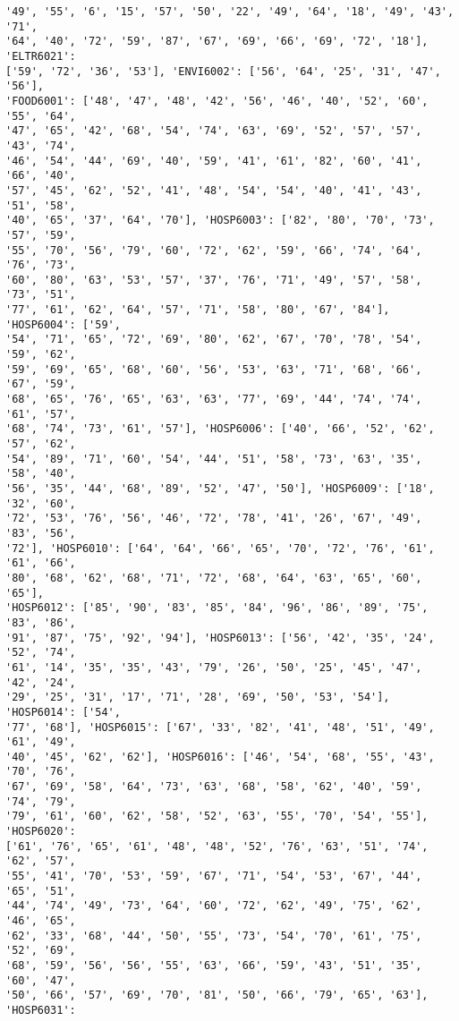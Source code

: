 \documentclass[11pt]{article}
\begin{document}
\begin{Verbatim}[commandchars=\\\{\}]
'49', '55', '6', '15', '57', '50', '22', '49', '64', '18', '49', '43', '71',
'64', '40', '72', '59', '87', '67', '69', '66', '69', '72', '18'], 'ELTR6021':
['59', '72', '36', '53'], 'ENVI6002': ['56', '64', '25', '31', '47', '56'],
'FOOD6001': ['48', '47', '48', '42', '56', '46', '40', '52', '60', '55', '64',
'47', '65', '42', '68', '54', '74', '63', '69', '52', '57', '57', '43', '74',
'46', '54', '44', '69', '40', '59', '41', '61', '82', '60', '41', '66', '40',
'57', '45', '62', '52', '41', '48', '54', '54', '40', '41', '43', '51', '58',
'40', '65', '37', '64', '70'], 'HOSP6003': ['82', '80', '70', '73', '57', '59',
'55', '70', '56', '79', '60', '72', '62', '59', '66', '74', '64', '76', '73',
'60', '80', '63', '53', '57', '37', '76', '71', '49', '57', '58', '73', '51',
'77', '61', '62', '64', '57', '71', '58', '80', '67', '84'], 'HOSP6004': ['59',
'54', '71', '65', '72', '69', '80', '62', '67', '70', '78', '54', '59', '62',
'59', '69', '65', '68', '60', '56', '53', '63', '71', '68', '66', '67', '59',
'68', '65', '76', '65', '63', '63', '77', '69', '44', '74', '74', '61', '57',
'68', '74', '73', '61', '57'], 'HOSP6006': ['40', '66', '52', '62', '57', '62',
'54', '89', '71', '60', '54', '44', '51', '58', '73', '63', '35', '58', '40',
'56', '35', '44', '68', '89', '52', '47', '50'], 'HOSP6009': ['18', '32', '60',
'72', '53', '76', '56', '46', '72', '78', '41', '26', '67', '49', '83', '56',
'72'], 'HOSP6010': ['64', '64', '66', '65', '70', '72', '76', '61', '61', '66',
'80', '68', '62', '68', '71', '72', '68', '64', '63', '65', '60', '65'],
'HOSP6012': ['85', '90', '83', '85', '84', '96', '86', '89', '75', '83', '86',
'91', '87', '75', '92', '94'], 'HOSP6013': ['56', '42', '35', '24', '52', '74',
'61', '14', '35', '35', '43', '79', '26', '50', '25', '45', '47', '42', '24',
'29', '25', '31', '17', '71', '28', '69', '50', '53', '54'], 'HOSP6014': ['54',
'77', '68'], 'HOSP6015': ['67', '33', '82', '41', '48', '51', '49', '61', '49',
'40', '45', '62', '62'], 'HOSP6016': ['46', '54', '68', '55', '43', '70', '76',
'67', '69', '58', '64', '73', '63', '68', '58', '62', '40', '59', '74', '79',
'79', '61', '60', '62', '58', '52', '63', '55', '70', '54', '55'], 'HOSP6020':
['61', '76', '65', '61', '48', '48', '52', '76', '63', '51', '74', '62', '57',
'55', '41', '70', '53', '59', '67', '71', '54', '53', '67', '44', '65', '51',
'44', '74', '49', '73', '64', '60', '72', '62', '49', '75', '62', '46', '65',
'62', '33', '68', '44', '50', '55', '73', '54', '70', '61', '75', '52', '69',
'68', '59', '56', '56', '55', '63', '66', '59', '43', '51', '35', '60', '47',
'50', '66', '57', '69', '70', '81', '50', '66', '79', '65', '63'], 'HOSP6031':

\end{Verbatim}
\end{document}
